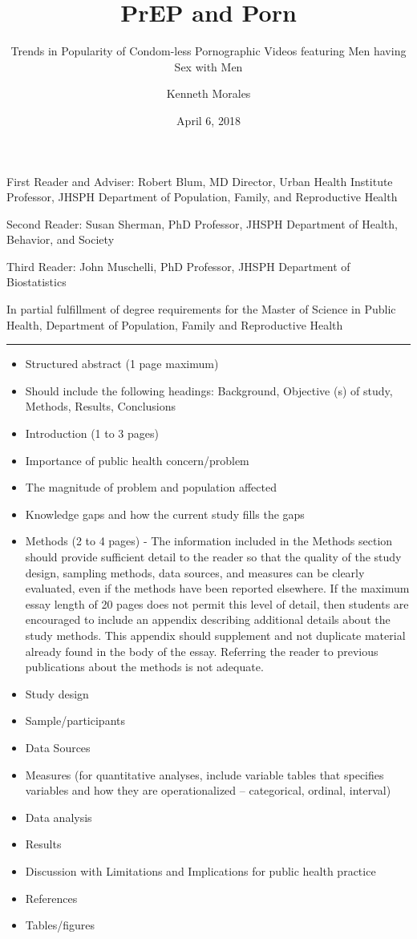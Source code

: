 \documentclass[]{article}
\title{PrEP and Porn}
\subtitle{Trends in Popularity of Condom-less Pornographic Videos featuring Men
having Sex with Men}
\author{Kenneth Morales}
\date{April 6, 2018}
\providecommand{\tightlist}{%
  \setlength{\itemsep}{0pt}\setlength{\parskip}{0pt}}
\begin{document}
\maketitle

First Reader and Adviser: Robert Blum, MD Director, Urban Health
Institute Professor, JHSPH Department of Population, Family, and
Reproductive Health

Second Reader: Susan Sherman, PhD Professor, JHSPH Department of Health,
Behavior, and Society

Third Reader: John Muschelli, PhD Professor, JHSPH Department of
Biostatistics

In partial fulfillment of degree requirements for the Master of Science
in Public Health, Department of Population, Family and Reproductive
Health

\begin{center}\rule{0.5\linewidth}{\linethickness}\end{center}

\begin{itemize}
\tightlist
\item
  Structured abstract (1 page maximum)
\item
  Should include the following headings: Background, Objective (s) of
  study, Methods, Results, Conclusions
\item
  Introduction (1 to 3 pages)
\item
  Importance of public health concern/problem
\item
  The magnitude of problem and population affected
\item
  Knowledge gaps and how the current study fills the gaps
\item
  Methods (2 to 4 pages) - The information included in the Methods
  section should provide sufficient detail to the reader so that the
  quality of the study design, sampling methods, data sources, and
  measures can be clearly evaluated, even if the methods have been
  reported elsewhere. If the maximum essay length of 20 pages does not
  permit this level of detail, then students are encouraged to include
  an appendix describing additional details about the study methods.
  This appendix should supplement and not duplicate material already
  found in the body of the essay. Referring the reader to previous
  publications about the methods is not adequate.
\item
  Study design
\item
  Sample/participants
\item
  Data Sources
\item
  Measures (for quantitative analyses, include variable tables that
  specifies variables and how they are operationalized -- categorical,
  ordinal, interval)
\item
  Data analysis
\item
  Results
\item
  Discussion with Limitations and Implications for public health
  practice
\item
  References
\item
  Tables/figures
\end{itemize}
\end{document}
